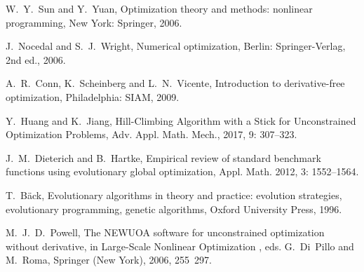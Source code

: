 \documentclass[final,1p,times]{elsarticle}
\begin{document}
\begin{thebibliography}{99}

W.~Y.~Sun and Y.~Yuan,
Optimization theory and methods: nonlinear programming,
New York: Springer, 2006.


J.~Nocedal and S.~J.~Wright,
Numerical optimization, 
Berlin: Springer-Verlag, 2nd ed., 2006.

A.~R.~Conn, K.~Scheinberg and L.~N.~Vicente,
Introduction to derivative-free optimization,
Philadelphia: SIAM, 2009.

{Y.~Huang and K.~Jiang,}
{Hill-Climbing Algorithm with a Stick for Unconstrained Optimization Problems},
{Adv. Appl. Math. Mech.},
2017, 9: 307--323.

J.~M.~Dieterich and B.~Hartke, 
Empirical review of standard benchmark functions using evolutionary global optimization,
{Appl. Math.} 2012, 3: 1552--1564.

T.~B{\"a}ck, 
Evolutionary algorithms in theory and practice: evolution
  strategies, evolutionary programming, genetic algorithms,
Oxford University Press, 1996.

M.~J.~D.~Powell,
The NEWUOA software for unconstrained optimization without derivative, in
Large-Scale Nonlinear Optimization , eds. G.~Di~Pillo
and M.~Roma, Springer (New York), 2006, 255~297.



\end{thebibliography}
\end{document}
